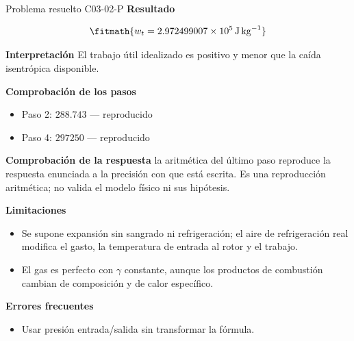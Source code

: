 \documentclass[10pt,openany]{book}
\begin{document}
\begin{studiumworked}{Problema resuelto C03-02-P}
\noindent\textbf{Resultado}

\[
\fitmath{w_t=2.972499007\times10^{5}\,\mathrm{J}\,\mathrm{kg}^{-1}}
\]

\noindent\textbf{Interpretación}
El trabajo útil idealizado es positivo y menor que la caída isentrópica disponible.

\noindent\textbf{Comprobación de los pasos}
\begin{itemize}
\item Paso 2: $288.743$ — reproducido
\item Paso 4: $297250$ — reproducido
\end{itemize}

\noindent\textbf{Comprobación de la respuesta} la aritmética del último paso reproduce la respuesta enunciada a la precisión con que está escrita. Es una reproducción aritmética; no valida el modelo físico ni sus hipótesis.

\noindent\textbf{Limitaciones}
\begin{itemize}
\item Se supone expansión sin sangrado ni refrigeración; el aire de refrigeración real modifica el gasto, la temperatura de entrada al rotor y el trabajo.
\item El gas es perfecto con $\gamma$ constante, aunque los productos de combustión cambian de composición y de calor específico.
\end{itemize}

\noindent\textbf{Errores frecuentes}
\begin{itemize}
\item Usar presión entrada/salida sin transformar la fórmula.
\end{itemize}
\end{studiumworked}
\end{document}
